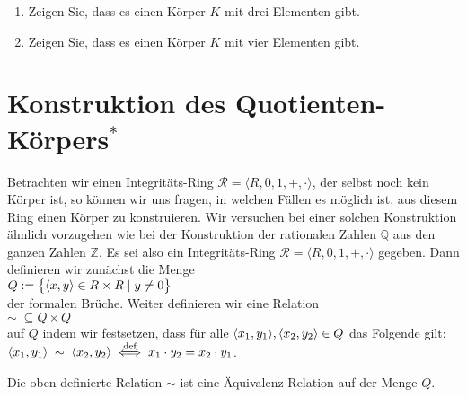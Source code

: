 \exercise
\renewcommand{\labelenumi}{(\alph{enumi})}
\begin{enumerate}
\item Zeigen Sie, dass es einen Körper $K$ mit drei Elementen gibt.
\item Zeigen Sie, dass es einen Körper $K$ mit vier Elementen gibt. \exend
\end{enumerate}
\renewcommand{\labelenumi}{\arabic{enumi}.}



\section{Konstruktion des Quotienten-Körpers$^*$}
Betrachten wir einen Integritäts-Ring $\mathcal{R} = \langle R, 0, 1, +, \cdot \rangle$, der selbst noch
kein Körper ist, so können wir uns fragen, in welchen Fällen es möglich ist, aus diesem
Ring einen Körper zu konstruieren.  Wir versuchen bei einer solchen Konstruktion ähnlich
vorzugehen wie bei der Konstruktion der rationalen Zahlen $\mathbb{Q}$ aus den ganzen
Zahlen $\mathbb{Z}$.  Es sei also ein Integritäts-Ring $\mathcal{R} = \langle R, 0, 1, +, \cdot \rangle$
gegeben.  Dann definieren wir zunächst die Menge
\\[0.2cm]
\hspace*{1.3cm}
$Q := \bigl\{ \pair(x,y) \in R \times R \mid y \not= 0 \bigr\}$
\\[0.2cm]
der formalen Brüche.  Weiter definieren wir eine Relation 
\\[0.2cm]
\hspace*{1.3cm}
$\sim \;\subseteq Q \times Q$
\\[0.2cm]
auf $Q$ indem wir festsetzen, dass für alle $\pair(x_1,y_1), \pair(x_2,y_2) \in Q$ das Folgende gilt:
\\[0.2cm]
\hspace*{1.3cm}
$\pair(x_1, y_1) \;\sim\; \pair(x_2, y_2) \df x_1 \cdot y_2 = x_2 \cdot y_1$.

\begin{Satz}
Die oben definierte Relation  $\sim$ ist eine Äquivalenz-Relation auf der Menge $Q$.
\end{Satz}

